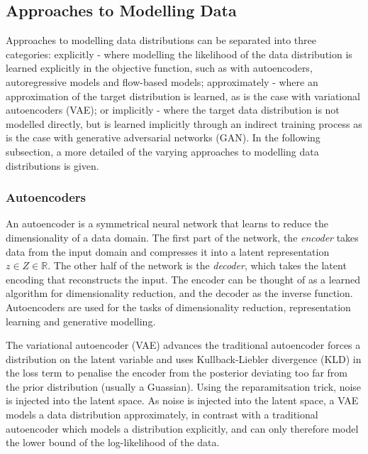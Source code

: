 \subsection{Approaches to Modelling Data}

Approaches to modelling data distributions can be separated into three categories: explicitly - where modelling the likelihood of the data distribution is learned explicitly in the objective function, such as with autoencoders, autoregressive models and flow-based models; approximately - where an approximation of the target distribution is learned, as is the case with variational autoencoders (VAE); or implicitly - where the target data distribution is not modelled directly, but is learned implicitly through an indirect training process as is the case with generative adversarial networks (GAN).
In the following subsection, a more detailed of the varying approaches to modelling data distributions is given. 

\subsubsection{Autoencoders}

An autoencoder is a symmetrical neural network that learns to reduce the dimensionality of a data domain. 
The first part of the network, the \textit{encoder} takes data from the input domain and compresses it into a latent representation $z \in Z \in \mathbb{R}$. 
The other half of the network is the \textit{decoder}, which takes the latent encoding that reconstructs the input. 
The encoder can be thought of as a learned algorithm for dimensionality reduction, and the decoder as the inverse function. 
Autoencoders are used for the tasks of dimensionality reduction, representation learning and generative modelling.

The variational autoencoder (VAE) \citep{kingma2013auto, rezende2014stochastic} advances the traditional autoencoder forces a distribution on the latent variable and uses Kullback-Liebler divergence (KLD) in the loss term to penalise the encoder from the posterior deviating too far from the prior distribution (usually a Guassian). 
Using the reparamitsation trick, noise is injected into the latent space. 
As noise is injected into the latent space, a VAE models a data distribution approximately, in contrast with a traditional autoencoder which models a distribution explicitly, and can only therefore model the lower bound of the log-likelihood of the data. 

